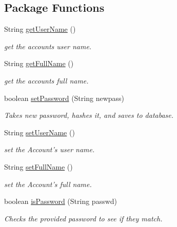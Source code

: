 \subsection*{Package Functions}
\begin{CompactItemize}
\item 
String \hyperlink{classAccount_16fba083bc4400303f070e775272fd11}{getUserName} ()
\begin{CompactList}\small\item\em get the accounts user name. \item\end{CompactList}\item 
String \hyperlink{classAccount_682c54ac7722ac83f9755ef83dfd69aa}{getFullName} ()
\begin{CompactList}\small\item\em get the accounts full name. \item\end{CompactList}\item 
boolean \hyperlink{classAccount_afe1f765fc54335bee76563973e09cb2}{setPassword} (String newpass)
\begin{CompactList}\small\item\em Takes new password, hashes it, and saves to database. \item\end{CompactList}\item 
String \hyperlink{classAccount_b243d54ab5be144d1185b0717f98955f}{setUserName} ()
\begin{CompactList}\small\item\em set the Account's user name. \item\end{CompactList}\item 
String \hyperlink{classAccount_b24ee6fdfa6029cba65b217050933c89}{setFullName} ()
\begin{CompactList}\small\item\em set the Account's full name. \item\end{CompactList}\item 
boolean \hyperlink{classAccount_49681dc24e580eee8030061c1ca30614}{isPassword} (String passwd)
\begin{CompactList}\small\item\em Checks the provided password to see if they match. \item\end{CompactList}\end{CompactItemize}
